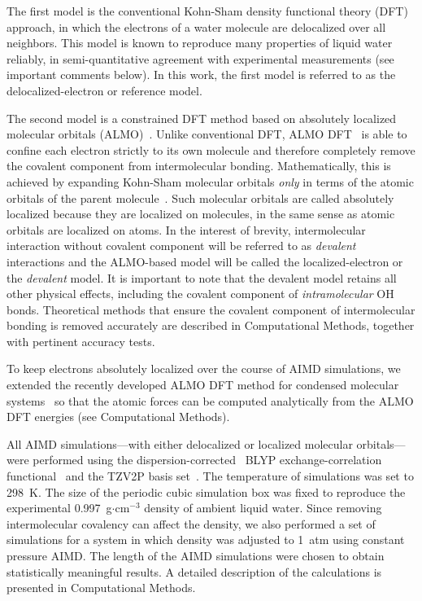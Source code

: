 \documentclass[journal=jacsat,manuscript=article]{achemso}
\begin{document}
The first model is the conventional Kohn-Sham density functional theory (DFT) approach, in which the electrons of a water molecule are delocalized over all neighbors. 
This model is known to reproduce many properties of liquid water reliably, in semi-quantitative agreement with experimental measurements (see important comments below). 
In this work, the first model is referred to as the delocalized-electron or reference model. 

The second model is a constrained DFT method based on absolutely localized molecular orbitals (ALMO)~\cite{khaliullin2006efficient}. 
Unlike conventional DFT, ALMO DFT~\cite{Khaliullin2013JCTC} is able to confine each electron strictly to its own molecule and therefore completely remove the covalent component from intermolecular bonding. 
Mathematically, this is achieved by expanding Kohn-Sham molecular orbitals \emph{only} in terms of the atomic orbitals of the parent molecule~\cite{stoll1980use,khaliullin2006efficient, mo2000energy}.
Such molecular orbitals are called absolutely localized because they are localized on molecules, in the same sense as atomic orbitals are localized on atoms. 
In the interest of brevity, intermolecular interaction without covalent component will be referred to as \emph{devalent} interactions and the ALMO-based model will be called the localized-electron or the \emph{devalent} model. 
It is important to note that the devalent model retains all other physical effects, including the covalent component of \emph{intramolecular} OH bonds. %
Theoretical methods that ensure the covalent component of intermolecular bonding is removed accurately are described in Computational Methods, together with pertinent accuracy tests.

To keep electrons absolutely localized over the course of AIMD simulations, we extended the recently developed ALMO DFT method for condensed molecular systems~\cite{Khaliullin2013JCTC} so that the atomic forces can be computed analytically from the ALMO DFT energies (see Computational Methods).

All AIMD simulations---with either delocalized or localized molecular orbitals---were performed using the dispersion-corrected~\cite{grimme2010consistent} BLYP exchange-correlation functional~\cite{becke1988density, lee1988development} and the TZV2P basis set~\cite{vandevondele2007gaussian}. 
The temperature of simulations was set to 298~K. 
The size of the periodic cubic simulation box was fixed to reproduce the experimental 0.997~g$\cdot$cm$^{-3}$ density of ambient liquid water. 
Since removing intermolecular covalency can affect the density, we also performed a set of simulations for a system in which density was adjusted to 1~atm using constant pressure AIMD. 
The length of the AIMD simulations were chosen to obtain statistically meaningful results. 
A detailed description of the calculations is presented in Computational Methods.
\end{document}
